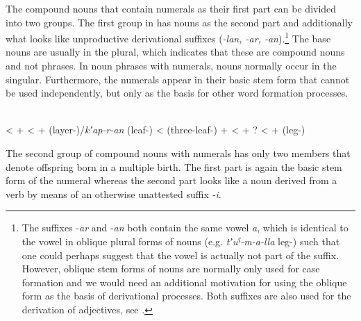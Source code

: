 %

The compound nouns that contain numerals as their first part can be divided into two groups. The first group in  has nouns as the second part and additionally what looks like unproductive derivational suffixes (\textit{-lan, -ar, -an}).\footnote{The suffixes -\textit{ar} and -\textit{an} both contain the same vowel \textit{a}, which is identical to the vowel in oblique plural forms of nouns (e.g. \textit{tʼuˁ-m-a-lla} leg-) such that one could perhaps suggest that the vowel is actually not part of the suffix. However, oblique stem forms of nouns are normally only used for case formation and we would need an additional motivation for using the oblique form as the basis of derivational processes. Both suffixes are also used for the derivation of adjectives, see .} The base nouns are usually in the plural, which indicates that these are compound nouns and not phrases. In noun phrases with numerals, nouns normally occur in the singular. Furthermore, the numerals appear in their basic stem form that cannot be used independently, but only as the basis for other word formation processes. 

\begin{exe}
	\ex	\label{ex:CompoundNounsNumerals} 
	\begin{xlist}
		\TabPositions{2em,4em}
			\ex	{}			\\
			\tab	<	\tab	 {}  +  										
			\ex	{}			\tab	<	\tab	 {}  +  (layer-)\slash\textit{kʼap-r-an} (leaf-)
			\ex	{}			\tab	<	\tab	 {} (three-leaf-) +  
			\ex	{}			\tab	<	\tab	{}  + ?	
			\ex	{}			\tab	<	\tab	{}  +  (leg-)						
	\end{xlist}
\end{exe}	

The second group of compound nouns with numerals has only two members  that denote offspring born in a multiple birth. The first part is again the basic stem form of the numeral whereas the second part looks like a noun derived from a verb by means of an otherwise unattested suffix \textit{-i}.

